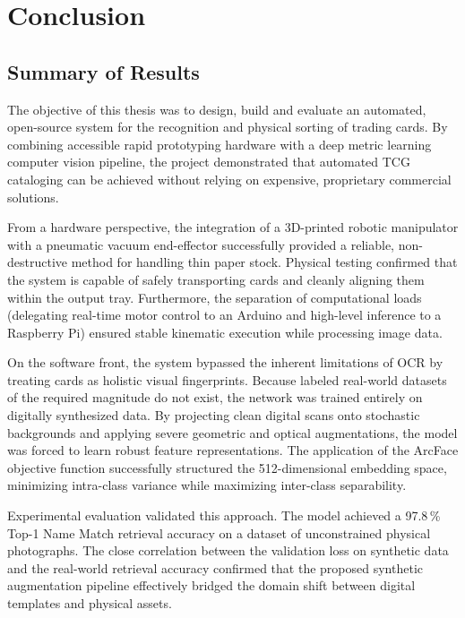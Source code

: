 
\chapter{Conclusion}\label{chap:conclusion}

\section{Summary of Results}
The objective of this thesis was to design, build and evaluate an automated, open-source system for the recognition and physical sorting of trading cards. By combining accessible rapid prototyping hardware with a deep metric learning computer vision pipeline, the project demonstrated that automated \ac{TCG} cataloging can be achieved without relying on expensive, proprietary commercial solutions.

From a hardware perspective, the integration of a 3D-printed robotic manipulator with a pneumatic vacuum end-effector successfully provided a reliable, non-destructive method for handling thin paper stock. Physical testing confirmed that the system is capable of safely transporting cards and cleanly aligning them within the output tray. Furthermore, the separation of computational loads (delegating real-time motor control to an Arduino and high-level inference to a Raspberry Pi) ensured stable kinematic execution while processing image data.

On the software front, the system bypassed the inherent limitations of \ac{OCR} by treating cards as holistic visual fingerprints. Because labeled real-world datasets of the required magnitude do not exist, the network was trained entirely on digitally synthesized data. By projecting clean digital scans onto stochastic backgrounds and applying severe geometric and optical augmentations, the model was forced to learn robust feature representations. The application of the ArcFace objective function successfully structured the 512-dimensional embedding space, minimizing intra-class variance while maximizing inter-class separability.

Experimental evaluation validated this approach. The model achieved a 97.8\,\% Top-1 Name Match retrieval accuracy on a dataset of unconstrained physical photographs. The close correlation between the validation loss on synthetic data and the real-world retrieval accuracy confirmed that the proposed synthetic augmentation pipeline effectively bridged the domain shift between digital templates and physical assets.

